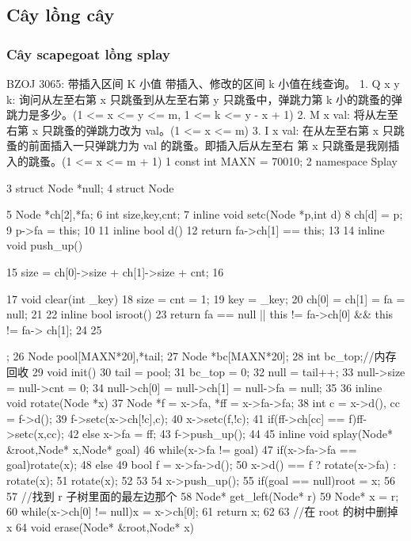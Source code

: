\documentclass[11pt]{article}
\begin{document}
\subsection{Cây lồng cây}

\subsubsection{Cây scapegoat lồng splay}

\begin{Code}
    BZOJ 3065: 带插入区间 K 小值
    带插入、修改的区间 k 小值在线查询。
    1. Q x y k: 询问从左至右第 x 只跳蚤到从左至右第 y 只跳蚤中，弹跳力第 k 小的跳蚤的弹
    跳力是多少。(1 <= x <= y <= m, 1 <= k <= y - x + 1)
    2. M x val: 将从左至右第 x 只跳蚤的弹跳力改为 val。(1 <= x <= m)
    3. I x val: 在从左至右第 x 只跳蚤的前面插入一只弹跳力为 val 的跳蚤。即插入后从左至右
    第 x 只跳蚤是我刚插入的跳蚤。(1 <= x <= m + 1)
 1 const int MAXN = 70010;
 2 namespace Splay{
 3     struct Node *null;
 4     struct Node{
 5         Node *ch[2],*fa;
 6         int size,key,cnt;
 7         inline void setc(Node *p,int d){
 8             ch[d] = p;
 9             p->fa = this;
10         }
11         inline bool d(){
12             return fa->ch[1] == this;
13         }
14         inline void push_up(){


15                  size = ch[0]->size + ch[1]->size + cnt;
16              }
17              void clear(int _key){
18                  size = cnt = 1;
19                  key = _key;
20                  ch[0] = ch[1] = fa = null;
21              }
22              inline bool isroot(){
23                  return fa == null || this != fa->ch[0] && this != fa->
                       ch[1];
24              }
25       };
26       Node pool[MAXN*20],*tail;
27       Node *bc[MAXN*20];
28       int bc_top;//内存回收
29       void init(){
30           tail = pool;
31           bc_top = 0;
32           null = tail++;
33           null->size = null->cnt = 0;
34           null->ch[0] = null->ch[1] = null->fa = null;
35       }
36       inline void rotate(Node *x){
37           Node *f = x->fa, *ff = x->fa->fa;
38           int c = x->d(), cc = f->d();
39           f->setc(x->ch[!c],c);
40           x->setc(f,!c);
41           if(ff->ch[cc] == f)ff->setc(x,cc);
42           else x->fa = ff;
43           f->push_up();
44       }
45       inline void splay(Node* &root,Node* x,Node* goal){
46           while(x->fa != goal){
47               if(x->fa->fa == goal)rotate(x);
48               else {
49                   bool f = x->fa->d();
50                   x->d() == f ? rotate(x->fa) : rotate(x);
51                   rotate(x);
52               }
53           }
54           x->push_up();
55           if(goal == null)root = x;
56       }
57       //找到 r 子树里面的最左边那个
58       Node* get_left(Node* r){
59           Node* x = r;
60           while(x->ch[0] != null)x = x->ch[0];
61           return x;
62       }
63       //在 root 的树中删掉 x
64       void erase(Node* &root,Node* x){


}}
\end{Code}
\end{document}
